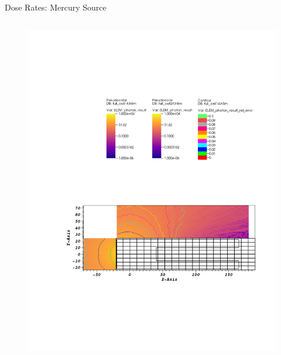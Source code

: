 \documentclass{beamer}
\begin{document}
\begin{frame}{Dose Rates: Mercury Source}
\begin{columns}[T]
        \begin{figure}
                \includegraphics[scale=0.49,trim={6.75cm 16.5cm 11cm 6cm},clip]{figs/dose_mer_cell_novoid.pdf}
        \end{figure}
\end{columns}

\begin{columns}[T]


\end{columns}
\end{frame}
\end{document}
